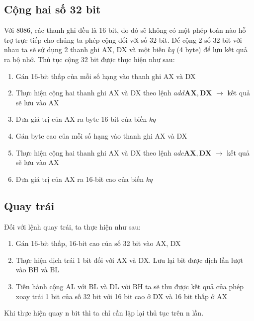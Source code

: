 \documentclass[../report.tex]{subfiles}
\begin{document}
\subsection{Cộng hai số 32 bit}
Với 8086, các thanh ghi đều là 16 bit, do đó sẽ không có một phép toán nào hỗ trợ trực tiếp cho chúng ta phép cộng đối với số 32 bit.
Để cộng 2 số 32 bit với nhau ta sẽ sử dụng 2 thanh ghi AX, DX và một biến $kq$ (4 byte) để lưu kết quả ra bộ nhớ. Thủ tục cộng 32 bit được thực hiện như sau:
\begin{enumerate}
    \item Gán 16-bit thấp của mỗi số hạng vào thanh ghi AX và DX
    \item Thực hiện cộng hai thanh ghi AX và DX theo lệnh $add \textbf{AX}, \textbf{DX}$ $\rightarrow$ kết quả sẽ lưu vào AX
    \item Đưa giá trị của AX ra byte 16-bit của biến $kq$
    \item Gán byte cao của mỗi số hạng vào thanh ghi AX và DX
    \item Thực hiện cộng hai thanh ghi AX và DX theo lệnh $adc \textbf{AX}, \textbf{DX}$ $\rightarrow$ kết quả sẽ lưu vào AX
    \item Đưa giá trị của AX ra 16-bit cao của biến $kq$
\end{enumerate}
\subsection{Quay trái}
Đối với lệnh quay trái, ta thực hiện như sau:
\begin{enumerate}
    \item Gán 16-bit thấp, 16-bit cao của số 32 bit vào AX, DX
    \item Thực hiện dịch trái 1 bit đối với AX và DX. Lưu lại bit được dịch lần lượt vào BH và BL
    \item Tiến hành cộng AL với BL và DL với BH ta sẽ thu được kết quả của phép xoay trái 1 bit của số 32 bit với 16 bit cao ở DX và 16 bit thấp ở AX
\end{enumerate}
Khi thực hiện quay n bit thì ta chỉ cần lặp lại thủ tục trên n lần.
\end{document}
